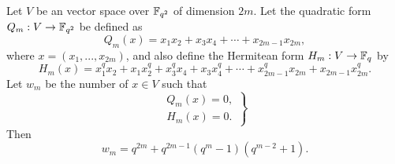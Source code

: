 	\begin{theorem}
		Let $V$ be an vector space over $\mathbb{F}_{q^2}$ of dimension $2m$. 
		Let the quadratic form $Q_m:V \rightarrow \mathbb{F}_{q^2}$ be defined as
		\begin{equation}
			Q_m(x) = x_1 x_2 + x_3 x_4 + \cdots + x_{2m-1} x_{2m},
		\end{equation}
		where $x = (x_1, ..., x_{2m})$, 
		and also define the Hermitean form $H_m:V \rightarrow \mathbb{F}_q$ by
		\begin{equation}
			H_m(x) = x_1^q x_2 + x_1 x_2^q + x_3^q x_4 + x_3 x_4^q + \cdots + x_{2m-1}^q x_{2m}
				+ x_{2m-1} x_{2m}^q.
		\end{equation}
		Let $w_m$ be the number of $x \in V$ such that
		\begin{equation}
			\label{eq:system1}
			\left.
				\begin{array}{l}
					Q_m(x) = 0, \\
					H_m(x) = 0.
				\end{array}
			\right\}
		\end{equation}
		Then
		\begin{equation}
			w_m = q^{2m} + q^{2m-1}(q^m-1)(q^{m-2}+1).
		\end{equation}
	\end{theorem}

